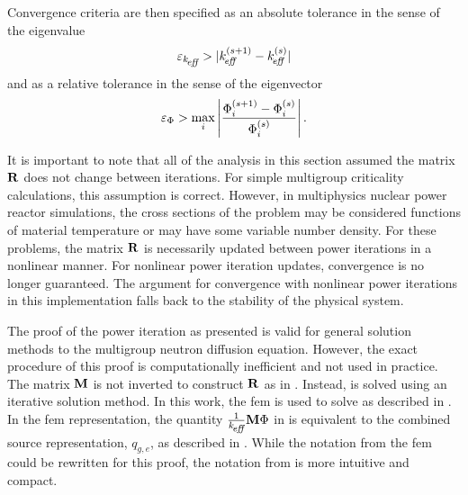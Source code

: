     Convergence criteria are then specified as an absolute 
    tolerance in the sense of the eigenvalue
    \begin{equation}
      \label{eq:eigenvalue_tol}
      \varepsilon_{k_{\!\mbox{\scriptsize \em eff}}} > | k_{\!\mbox{\scriptsize \em eff}}^{(s+1)} - k_{\!\mbox{\scriptsize \em eff}}^{(s)} |
    \end{equation}
    and as a relative tolerance in the sense of the eigenvector
    \begin{equation}
      \label{eq:eigenvector_tol}
      \varepsilon_{\Phi} > \max_i \left| \frac{\Phi_i^{(s+1)} - \Phi_i^{(s)}}
        {\Phi_i^{(s)}}\right| .
    \end{equation}

    It is important to note that all of the analysis in this section assumed the
    matrix $\mathbf{R}$ does not change between iterations. For simple multigroup
    criticality calculations, this assumption is correct. However, in
    multiphysics nuclear power reactor simulations, the cross sections of the 
    problem may be considered functions of material temperature or may have some
    variable number density. For these problems, the matrix $\mathbf{R}$ is necessarily
    updated between power iterations in a nonlinear manner. For nonlinear power
    iteration updates, convergence is no longer guaranteed. The argument for
    convergence with nonlinear power iterations in this implementation falls
    back to the stability of the physical system.

    The proof of the power iteration as presented is valid for general solution
    methods to the multigroup neutron diffusion equation. However, the exact
    procedure of this proof is computationally inefficient and not used in
    practice. The matrix $\mathbf{M}$ is not inverted to construct $\mathbf{R}$ as in
    . Instead,  is solved using an
    iterative solution method. In this work, the \gls{fem} is used to solve
     as described in . In the
    \gls{fem} representation, the quantity $\frac{1}{k_{\!\mbox{\scriptsize \em eff}}} \mathbf{M} \Phi$ in
     is equivalent to the combined source
    representation, $q_{g,e}$, as described in .
    While the notation from the \gls{fem} could be rewritten for this proof, the
    notation from  is more intuitive and compact.
    
